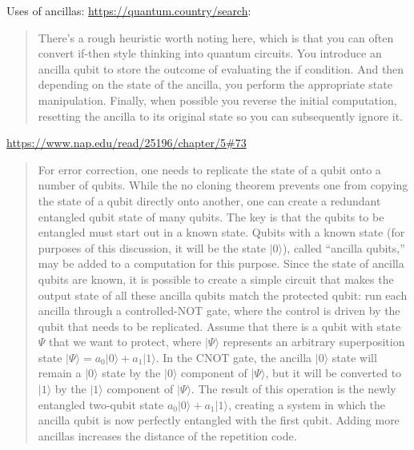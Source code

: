 \documentclass[sigplan,10pt,review,anonymous]{acmart}
\newcommand{\ket}[1]{|#1\rangle}
\begin{document}
Uses of ancillas:
\url{https://quantum.country/search}:

\begin{quote}
  There’s a rough heuristic worth noting here, which is that you can
  often convert if-then style thinking into quantum circuits. You
  introduce an ancilla qubit to store the outcome of evaluating the if
  condition. And then depending on the state of the ancilla, you
  perform the appropriate state manipulation. Finally, when possible
  you reverse the initial computation, resetting the ancilla to its
  original state so you can subsequently ignore it.
\end{quote}

\url{https://www.nap.edu/read/25196/chapter/5#73}
\begin{quote}
  For error correction, one needs to replicate the state of a qubit
  onto a number of qubits. While the no cloning theorem prevents one
  from copying the state of a qubit directly onto another, one can
  create a redundant entangled qubit state of many qubits. The key is
  that the qubits to be entangled must start out in a known
  state. Qubits with a known state (for purposes of this discussion,
  it will be the state $\ket{0}$), called ``ancilla qubits,'' may be
  added to a computation for this purpose. Since the state of ancilla
  qubits are known, it is possible to create a simple circuit that
  makes the output state of all these ancilla qubits match the
  protected qubit: run each ancilla through a controlled-NOT gate,
  where the control is driven by the qubit that needs to be
  replicated. Assume that there is a qubit with state $\Psi$ that we
  want to protect, where $\ket{\Psi}$ represents an arbitrary
  superposition state $\ket{\Psi} = a_0 \ket{0} + a_1 \ket{1}$. In the
  CNOT gate, the ancilla $\ket{0}$ state will remain a $\ket{0}$ state
  by the $\ket{0}$ component of $\ket{\Psi}$, but it will be converted
  to $\ket{1}$ by the $\ket{1}$ component of $\ket{\Psi}$. The result
  of this operation is the newly entangled two-qubit state
  $a_0 \ket{0} + a_1 \ket{1}$, creating a system in which the ancilla
  qubit is now perfectly entangled with the first qubit. Adding more
  ancillas increases the distance of the repetition code.  \end{quote}
\end{document}
